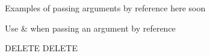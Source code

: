 \documentclass[12pt,a4paper,final]{report} %
\begin{document}
Examples of passing arguments by reference here soon

Use \& when passing an argument by reference

DELETE DELETE

\printbibliography[heading=bibintoc]
\end{document}
